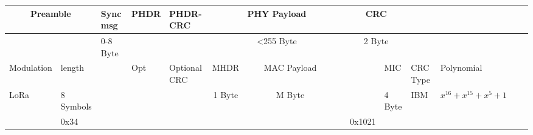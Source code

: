 \begin{table}[h!]

\fontsize{3pt}{3pt}\selectfont

\centering
\begin{tabular}{l|l|l|l|l|l|l|l|l|l|l|l|l|l|l|l|l|l|l|l|l|l|l|l|l|l}

\multicolumn{2}{c}{Preamble}						&	Sync msg 			&	PHDR  														&	PHDR-CRC 																	&	\multicolumn{15}{c}{PHY Payload}																																																																																																																																																																																																																																																																																				&	\multicolumn{2}{c}{CRC }										\\\hline
\multicolumn{2}{c}{}										&	0-8 Byte			&																		&																						&	\multicolumn{15}{c}{ <255 Byte}																																																																																																																																																																																																																																																																																					&	\multicolumn{2}{c}{2 Byte}									\\\hline
Modulation	&	length										&								&	Opt																&	Optional CRC															&	\multicolumn{3}{c}{MHDR }																																&	\multicolumn{11}{c}{MAC Payload}																																																																																																																																																																								&																							&																								& MIC 													&	CRC Type		&	Polynomial										\\\hline
LoRa				&	8 Symbols									&								&																		&																						&	\multicolumn{3}{c}{1 Byte}																															&	\multicolumn{11}{c}{M Byte }																																																																																																																																																																										&																							&																								& 4 Byte												&	IBM					&	$x^{16} + x^{15} + x^{5} + 1$	\\\hline
						&	0x34 											&								&																		&																						&															&															&															&																											&														&																							&																		&																			&																																	&																																		&																	&																							&																								&																& 						&	0x1021												\\\hline

\end{tabular}
\end{table}
